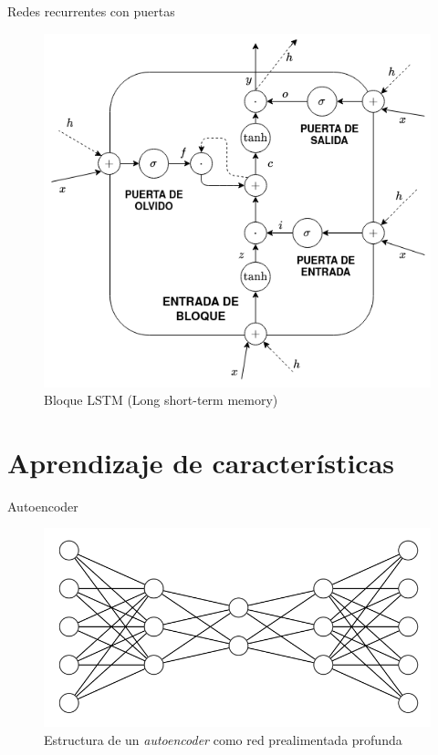 \documentclass[spanish]{beamer}
\begin{document}
\begin{frame}{Redes recurrentes con puertas}

\begin{figure}
\includegraphics[scale=0.41]{img/LSTM.png}
\caption{Bloque LSTM (Long short-term memory)}
\end{figure}

\end{frame}

\section{Aprendizaje de características}

\begin{frame}{Autoencoder}

\begin{figure}
\includegraphics[scale=0.4]{img/autoencoder.png}
\caption{Estructura de un \textit{autoencoder} como red prealimentada profunda}
\end{figure}

\end{frame}
\end{document}
